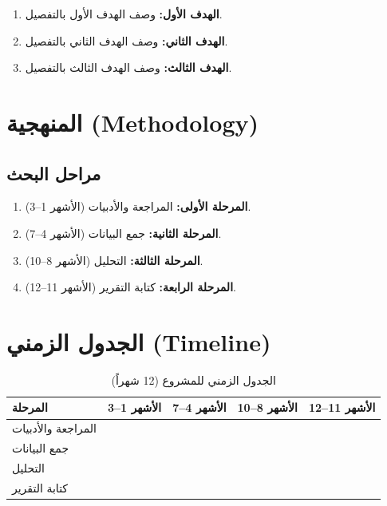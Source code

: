 \documentclass[11pt,a4paper]{article}
\begin{document}
\begin{enumerate}
    \item \textbf{الهدف الأول:} وصف الهدف الأول بالتفصيل.
    \item \textbf{الهدف الثاني:} وصف الهدف الثاني بالتفصيل.
    \item \textbf{الهدف الثالث:} وصف الهدف الثالث بالتفصيل.
\end{enumerate}

\section{المنهجية (Methodology)}
\label{sec:methodology}

\subsection{مراحل البحث}
\begin{enumerate}
    \item \textbf{المرحلة الأولى:} المراجعة والأدبيات (الأشهر 1--3).
    \item \textbf{المرحلة الثانية:} جمع البيانات (الأشهر 4--7).
    \item \textbf{المرحلة الثالثة:} التحليل (الأشهر 8--10).
    \item \textbf{المرحلة الرابعة:} كتابة التقرير (الأشهر 11--12).
\end{enumerate}

\section{الجدول الزمني (Timeline)}
\label{sec:timeline}


\begin{table}[H]
\centering
\caption{الجدول الزمني للمشروع (12 شهراً)}
\small
{}
\begin{tabular}{|l|c|c|c|c|}
\hline
\textbf{المرحلة} & \textbf{الأشهر 1--3} & \textbf{الأشهر 4--7} & \textbf{الأشهر 8--10} & \textbf{الأشهر 11--12} \\
\hline
المراجعة والأدبيات & \cellcolor{bar} & & & \\
\hline
جمع البيانات & & \cellcolor{bar} & & \\
\hline
التحليل & & & \cellcolor{bar} & \\
\hline
كتابة التقرير & & & & \cellcolor{bar} \\
\hline
\end{tabular}
\end{table}
\end{document}
